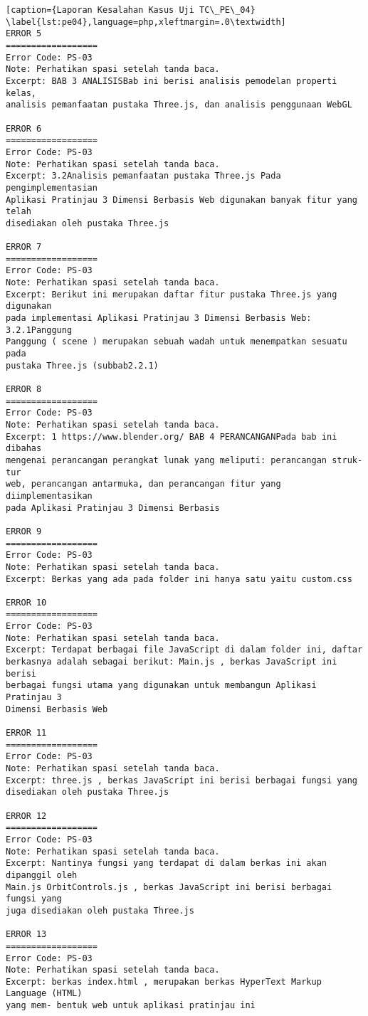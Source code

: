 \begin{enumerate}
\begin{lstlisting}[caption={Laporan Kesalahan Kasus Uji TC\_PE\_04}	\label{lst:pe04},language=php,xleftmargin=.0\textwidth]
ERROR 5
==================
Error Code: PS-03
Note: Perhatikan spasi setelah tanda baca.
Excerpt: BAB 3 ANALISISBab ini berisi analisis pemodelan properti kelas, 
analisis pemanfaatan pustaka Three.js, dan analisis penggunaan WebGL

ERROR 6
==================
Error Code: PS-03
Note: Perhatikan spasi setelah tanda baca.
Excerpt: 3.2Analisis pemanfaatan pustaka Three.js Pada pengimplementasian 
Aplikasi Pratinjau 3 Dimensi Berbasis Web digunakan banyak fitur yang telah 
disediakan oleh pustaka Three.js

ERROR 7
==================
Error Code: PS-03
Note: Perhatikan spasi setelah tanda baca.
Excerpt: Berikut ini merupakan daftar fitur pustaka Three.js yang digunakan 
pada implementasi Aplikasi Pratinjau 3 Dimensi Berbasis Web: 3.2.1Panggung 
Panggung ( scene ) merupakan sebuah wadah untuk menempatkan sesuatu pada 
pustaka Three.js (subbab2.2.1)

ERROR 8
==================
Error Code: PS-03
Note: Perhatikan spasi setelah tanda baca.
Excerpt: 1 https://www.blender.org/ BAB 4 PERANCANGANPada bab ini dibahas 
mengenai perancangan perangkat lunak yang meliputi: perancangan struk- tur 
web, perancangan antarmuka, dan perancangan fitur yang diimplementasikan 
pada Aplikasi Pratinjau 3 Dimensi Berbasis

ERROR 9
==================
Error Code: PS-03
Note: Perhatikan spasi setelah tanda baca.
Excerpt: Berkas yang ada pada folder ini hanya satu yaitu custom.css

ERROR 10
==================
Error Code: PS-03
Note: Perhatikan spasi setelah tanda baca.
Excerpt: Terdapat berbagai file JavaScript di dalam folder ini, daftar 
berkasnya adalah sebagai berikut: Main.js , berkas JavaScript ini berisi 
berbagai fungsi utama yang digunakan untuk membangun Aplikasi Pratinjau 3 
Dimensi Berbasis Web

ERROR 11
==================
Error Code: PS-03
Note: Perhatikan spasi setelah tanda baca.
Excerpt: three.js , berkas JavaScript ini berisi berbagai fungsi yang 
disediakan oleh pustaka Three.js

ERROR 12
==================
Error Code: PS-03
Note: Perhatikan spasi setelah tanda baca.
Excerpt: Nantinya fungsi yang terdapat di dalam berkas ini akan dipanggil oleh 
Main.js OrbitControls.js , berkas JavaScript ini berisi berbagai fungsi yang 
juga disediakan oleh pustaka Three.js

ERROR 13
==================
Error Code: PS-03
Note: Perhatikan spasi setelah tanda baca.
Excerpt: berkas index.html , merupakan berkas HyperText Markup Language (HTML) 
yang mem- bentuk web untuk aplikasi pratinjau ini


\end{lstlisting}
\end{enumerate}
